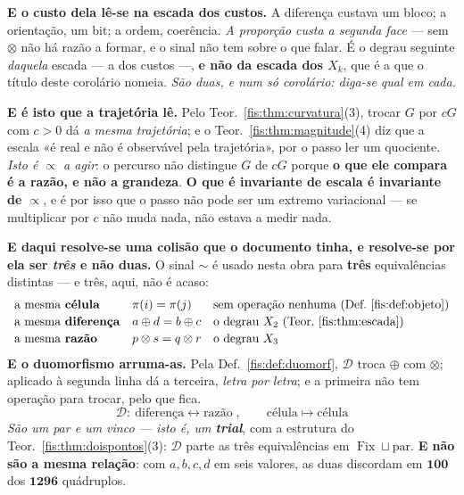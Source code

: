 \documentclass[livro.tex]{subfiles}
\begin{document}
\medskip\noindent\textbf{E o custo dela lê-se na escada dos custos.} A diferença
custava um bloco; a orientação, um bit; a ordem, coerência. \emph{A proporção
custa a segunda face} --- sem $\otimes$ não há razão a formar, e o sinal não tem
sobre o que falar. É o degrau seguinte \emph{daquela} escada --- a dos custos ---,
\textbf{e não da escada dos $X_k$}, que é a que o título deste corolário nomeia.
\emph{São duas, e num só corolário: diga-se qual em cada.}

\medskip\noindent\textbf{E é isto que a trajetória lê.} Pelo
Teor.~\ref{fis:thm:curvatura}(3), trocar $G$ por $cG$ com $c>0$ dá \emph{a mesma
trajetória}; e o Teor.~\ref{fis:thm:magnitude}(4) diz que a escala «é real e não
é observável pela trajetória», por o passo ler um quociente. \emph{Isto é
$\propto$ a agir}: o percurso não distingue $G$ de $cG$ porque \textbf{o que ele
compara é a razão, e não a grandeza}. \textbf{O que é invariante de escala é
invariante de $\propto$}, e é por isso que o passo não pode ser um extremo
variacional --- se multiplicar por $c$ não muda nada, não estava a medir nada.

\medskip\noindent\textbf{E daqui resolve-se uma colisão que o documento tinha, e
resolve-se por ela ser \emph{três} e não duas.} O sinal $\sim$ é usado nesta obra
para \textbf{três} equivalências distintas --- e três, aqui, não é acaso:
\[
\begin{array}{lll}
\text{a mesma \textbf{célula}} & \pi(i)=\pi(j) & \text{sem operação nenhuma (Def.~\ref{fis:def:objeto})}\\[2pt]
\text{a mesma \textbf{diferença}} & a\oplus d=b\oplus c & \text{o degrau }X_2\ \text{(Teor.~\ref{fis:thm:escada})}\\[2pt]
\text{a mesma \textbf{razão}} & p\otimes s=q\otimes r & \text{o degrau }X_3
\end{array}
\]
\textbf{E o duomorfismo arruma-as.} Pela Def.~\ref{fis:def:duomorf}, $\mathcal D$
troca $\oplus$ com $\otimes$; aplicado à segunda linha dá a terceira, \emph{letra
por letra}; e a primeira não tem operação para trocar, pelo que fica.
\[
\boxed{\;\mathcal{D}\colon\ \text{diferença}\longleftrightarrow\text{razão}\;,\qquad \text{célula}\longmapsto\text{célula}\;}
\]
\emph{São um par e um vinco --- isto é, um \textbf{trial}}, com a estrutura do
Teor.~\ref{fis:thm:doispontos}(3): $\mathcal D$ parte as três equivalências em
$\operatorname{Fix}\sqcup\text{par}$. \textbf{E não são a mesma relação}: com
$a,b,c,d$ em seis valores, as duas discordam em $\mathbf{100}$ dos
$\mathbf{1296}$ quádruplos.
\end{document}
